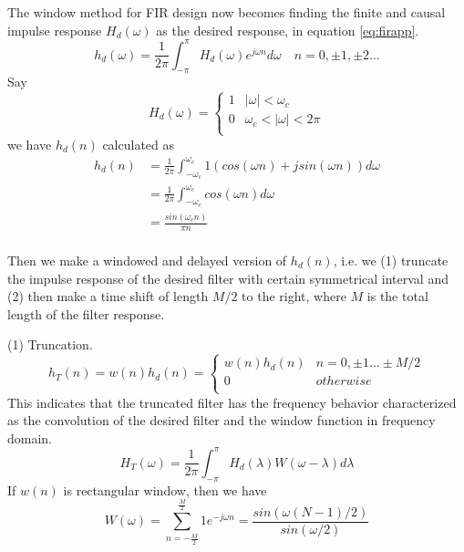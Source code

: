 The window method for FIR design now becomes finding the 
finite and causal impulse response $H_d(\omega)$ as the desired response,
in equation \ref{eq:firapp}.
\begin{equation}
  \label{eq:firapp}
  h_d(\omega)=\frac{1}{2\pi}\int_{-\pi}^{\pi}H_d(\omega)e^{j\omega n}d\omega \quad n=0, \pm 1, \pm 2 \dots
\end{equation}
Say 
\begin{equation}
  \label{eq:firdesire}
  H_d(\omega) = \left\{
    \begin{array}{cc}
      1 & |\omega| < \omega_c \\
      0 & \omega_c < |\omega| < 2\pi \\
    \end{array}
    \right.
\end{equation} 
we have $h_d(n)$ calculated as 
\begin{equation}
  \label{eq:firidtft}
  \begin{aligned}
    h_d(n) & = \frac{1}{2\pi}\int_{-\omega_c}^{\omega_c}1 (cos(\omega n) + j sin(\omega n)) d\omega \\
             & = \frac{1}{2\pi} \int_{-\omega_c}^{\omega_c}cos(\omega n) d\omega \\
            & = \frac{sin(\omega_c n)}{\pi n}\\
  \end{aligned}
\end{equation}

Then we make a windowed and delayed version of $h_d(n)$, i.e. we (1) truncate the 
impulse response of the desired filter with certain symmetrical interval and (2) then
make a time shift of length $M/2$ to the right, where $M$ is the total length of the 
filter response.

(1) Truncation. 
\begin{equation}
  \label{eq:truncation}
  h_T(n) = w(n)h_d(n) = \left\{
    \begin{array}{cc}
      w(n)h_d(n) & n = 0,\pm 1 \dots \pm M/2 \\
      0 & otherwise \\
    \end{array}
     \right.
\end{equation}
This indicates that the truncated filter has the frequency behavior characterized 
as the convolution of the desired filter and the window function in frequency domain.
\begin{equation}
  \label{eq:firwin}
  H_T(\omega) = \frac{1}{2\pi}\int_{-\pi}^{\pi}H_d(\lambda)W(\omega-\lambda) d \lambda
\end{equation}
If $w(n)$ is rectangular window, then we have
\begin{equation}
  \label{eq:recwin}
  W(\omega) = \sum_{n=-\frac{M}{2}}^{\frac{M}{2}}1 e^{-j\omega n} = \frac{sin(\omega(N-1)/2)}{sin(\omega /2)}
\end{equation}

